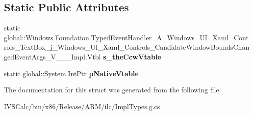 \subsection*{Static Public Attributes}
\begin{DoxyCompactItemize}
\item 
\mbox{\label{struct_windows_1_1_foundation_1_1_typed_event_handler___a___windows___u_i___xaml___controls___tea8675657ada60f534086508fa4403c3f_ada9c073a762a2a9973beade1fb51001e}} 
static global\+::\+Windows.\+Foundation.\+Typed\+Event\+Handler\+\_\+\+A\+\_\+\+Windows\+\_\+\+U\+I\+\_\+\+Xaml\+\_\+\+Controls\+\_\+\+Text\+Box\+\_\+j\+\_\+\+Windows\+\_\+\+U\+I\+\_\+\+Xaml\+\_\+\+Controls\+\_\+\+Candidate\+Window\+Bounds\+Changed\+Event\+Args\+\_\+\+V\+\_\+\+\_\+\+\_\+\+Impl.\+Vtbl {\bfseries s\+\_\+the\+Ccw\+Vtable}
\item 
\mbox{\label{struct_windows_1_1_foundation_1_1_typed_event_handler___a___windows___u_i___xaml___controls___tea8675657ada60f534086508fa4403c3f_ab4d25d594d3946017bd2806d9d5f661b}} 
static global\+::\+System.\+Int\+Ptr {\bfseries p\+Native\+Vtable}
\end{DoxyCompactItemize}


The documentation for this struct was generated from the following file\+:\begin{DoxyCompactItemize}
\item 
I\+V\+S\+Calc/bin/x86/\+Release/\+A\+R\+M/ilc/Impl\+Types.\+g.\+cs\end{DoxyCompactItemize}
